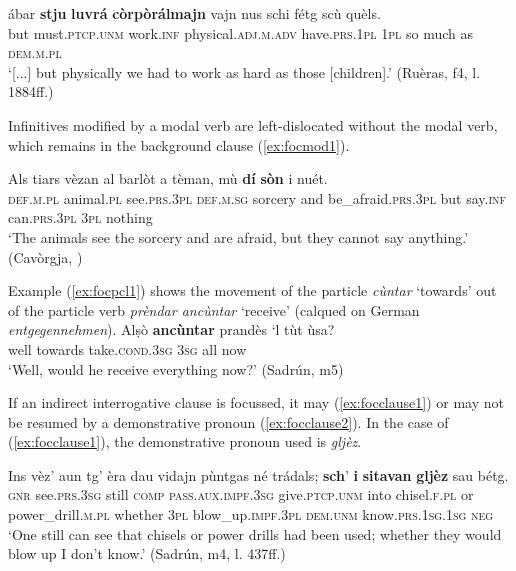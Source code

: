 \ea
\label{ex:focptcp3}
\gll [...] ábar \textbf{stju} \textbf{luvrá} \textbf{còrpòrálmajn} vajn nus schi fétg scù quèls.\\
{}	but must.\textsc{ptcp.unm} work.\textsc{inf} physical.\textsc{adj.m.adv} have.\textsc{prs.1pl} \textsc{1pl} so much as \textsc{dem.m.pl}\\
\glt `[...] but physically we had to work as hard as those [children].' (Ruèras, f4, l. 1884ff.)
\z

Infinitives modified by a modal verb are left-dislocated without the modal verb, which remains in the background clause (\ref{ex:focmod1}).

\ea
\label{ex:focmod1}
\gll Als tiars vèzan al barlòt a tèman, mù \textbf{dí} \textbf{sòn} i nuét.\\
     \textsc{def.m.pl} animal.\textsc{pl} see.\textsc{prs.3pl} \textsc{def.m.sg} sorcery and be\_afraid.\textsc{prs.3pl} but say.\textsc{inf} can.\textsc{prs.3pl} \textsc{3pl} nothing\\
\glt `The animals see the sorcery and are afraid, but they cannot say anything.' (Cavòrgja, \citealt[125]{Büchli1966})
\z

Example (\ref{ex:focpcl1}) shows the movement of the particle \textit{cùntar} `towards' out of the particle verb \textit{prèndar ancùntar} `receive' (calqued on German \textit{entgegennehmen}).
\ea
\label{ex:focpcl1}
\gll Alṣò \textbf{ancùntar} prandès `l tùt ùsa?\\
well towards take.\textsc{cond.3sg} \textsc{3sg} all	now\\
\glt `Well, would he receive everything now?' (Sadrún, m5)
\z

If an indirect interrogative clause is focussed, it may (\ref{ex:focclause1}) or may not be resumed by a demonstrative pronoun (\ref{ex:focclause2}). In the case of (\ref{ex:focclause1}), the demonstrative pronoun used is \textit{gljèz}.

\ea
\label{ex:focclause1}
\gll Ins vèz’ aun tg’ èra dau vidajn pùntgas né trádals; \textbf{sch}’ \textbf{i} \textbf{sitavan} \textbf{gljèz} sau bétg.\\
\textsc{gnr} see.\textsc{prs.3sg} still \textsc{comp} \textsc{pass.aux.impf.3sg} give.\textsc{ptcp.unm} into chisel.\textsc{f.pl} or power\_drill.\textsc{m.pl} whether \textsc{3pl} blow\_up.\textsc{impf.3pl} \textsc{dem.unm} know.\textsc{prs.1sg.1sg}  \textsc{neg}\\
\glt `One still can see that chisels or power drills had been used; whether they would blow up I don’t know.' (Sadrún, m4, l. 437ff.)
\z

